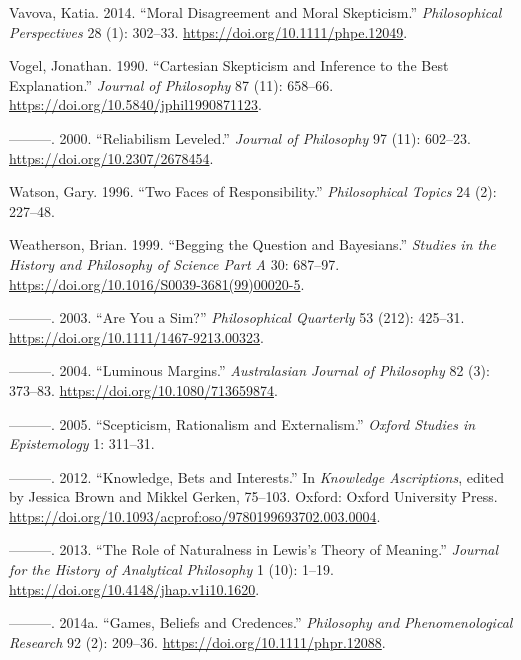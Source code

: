 \documentclass[
  10pt,
  letterpaper,
  twoside]{scrbook}
\newlength{\cslhangindent}
\newenvironment{CSLReferences}[2] %
 {\begin{list}{}{%
  \setlength{\itemindent}{0pt}
  \setlength{\leftmargin}{0pt}
  \setlength{\parsep}{0pt}
  \ifodd #1
   \setlength{\leftmargin}{\cslhangindent}
   \setlength{\itemindent}{-1\cslhangindent}
  \fi
  \setlength{\itemsep}{#2\baselineskip}}}
 {\end{list}}
\begin{document}
\begin{CSLReferences}{1}{0}
Vavova, Katia. 2014. {``Moral Disagreement and Moral Skepticism.''}
\emph{Philosophical Perspectives} 28 (1): 302--33.
\url{https://doi.org/10.1111/phpe.12049}.

Vogel, Jonathan. 1990. {``Cartesian Skepticism and Inference to the Best
Explanation.''} \emph{Journal of Philosophy} 87 (11): 658--66.
\url{https://doi.org/10.5840/jphil1990871123}.

---------. 2000. {``Reliabilism Leveled.''} \emph{Journal of Philosophy}
97 (11): 602--23. \url{https://doi.org/10.2307/2678454}.

Watson, Gary. 1996. {``Two Faces of Responsibility.''}
\emph{Philosophical Topics} 24 (2): 227--48.

Weatherson, Brian. 1999. {``Begging the Question and Bayesians.''}
\emph{Studies in the History and Philosophy of Science Part A} 30:
687--97. \url{https://doi.org/10.1016/S0039-3681(99)00020-5}.

---------. 2003. {``Are You a Sim?''} \emph{Philosophical Quarterly} 53
(212): 425--31. \url{https://doi.org/10.1111/1467-9213.00323}.

---------. 2004. {``Luminous Margins.''} \emph{Australasian Journal of
Philosophy} 82 (3): 373--83. \url{https://doi.org/10.1080/713659874}.

---------. 2005. {``Scepticism, Rationalism and Externalism.''}
\emph{Oxford Studies in Epistemology} 1: 311--31.

---------. 2012. {``Knowledge, Bets and Interests.''} In \emph{Knowledge
Ascriptions}, edited by Jessica Brown and Mikkel Gerken, 75--103.
Oxford: Oxford University Press.
\url{https://doi.org/10.1093/acprof:oso/9780199693702.003.0004}.

---------. 2013. {``The Role of Naturalness in Lewis's Theory of
Meaning.''} \emph{Journal for the History of Analytical Philosophy} 1
(10): 1--19. \url{https://doi.org/10.4148/jhap.v1i10.1620}.

---------. 2014a. {``Games, Beliefs and Credences.''} \emph{Philosophy
and Phenomenological Research} 92 (2): 209--36.
\url{https://doi.org/10.1111/phpr.12088}.


\end{CSLReferences}
\end{document}

